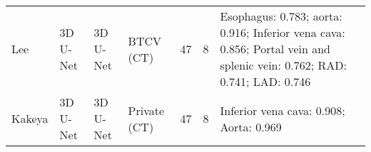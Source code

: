 \documentclass[lettersize,journal]{IEEEtran}
\begin{document}
{\begin{table*}[ht!]
{\begin{tabular}{@{}llllllm{}@{}}
Lee \cite{127}               & 3D U-Net                        & 3D U-Net                      & BTCV (CT) \cite{29}              & 47                        & 8                         & Esophagus: 0.783; aorta: 0.916; Inferior vena cava: 0.856; Portal vein and splenic vein: 0.762; RAD: 0.741; LAD: 0.746                                                     \\
Kakeya \cite{148}            & 3D U-Net                        & 3D U-Net                      & Private (CT)             & 47                        & 8                         & Inferior vena cava: 0.908; Aorta: 0.969                                                                                                                                    \\ \bottomrule
\end{tabular}%
}
\vspace{100pt}
\end{table*}

}
\end{document}
